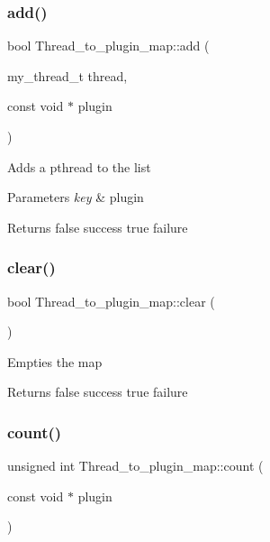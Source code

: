 \subsubsection{\texorpdfstring{add()}{add()}}
{\footnotesize\ttfamily bool Thread\+\_\+to\+\_\+plugin\+\_\+map\+::add (\begin{DoxyParamCaption}\item[{my\+\_\+thread\+\_\+t}]{thread,  }\item[{const void $\ast$}]{plugin }\end{DoxyParamCaption})\hspace{0.3cm}{\ttfamily [inline]}}

Adds a pthread to the list


\begin{DoxyParams}{Parameters}
{\em key} & plugin\\
\hline
\end{DoxyParams}
\begin{DoxyReturn}{Returns}
false success true failure 
\end{DoxyReturn}
\mbox{\label{classThread__to__plugin__map_a6f1775e4723f2b68eecc1f347dce506a}} 
\subsubsection{\texorpdfstring{clear()}{clear()}}
{\footnotesize\ttfamily bool Thread\+\_\+to\+\_\+plugin\+\_\+map\+::clear (\begin{DoxyParamCaption}{ }\end{DoxyParamCaption})\hspace{0.3cm}{\ttfamily [inline]}}

Empties the map

\begin{DoxyReturn}{Returns}
false success true failure 
\end{DoxyReturn}
\mbox{\label{classThread__to__plugin__map_ad58c72ec47a7a136e4ff4a6281581259}} 
\subsubsection{\texorpdfstring{count()}{count()}}
{\footnotesize\ttfamily unsigned int Thread\+\_\+to\+\_\+plugin\+\_\+map\+::count (\begin{DoxyParamCaption}\item[{const void $\ast$}]{plugin }\end{DoxyParamCaption})\hspace{0.3cm}{\ttfamily [inline]}}


